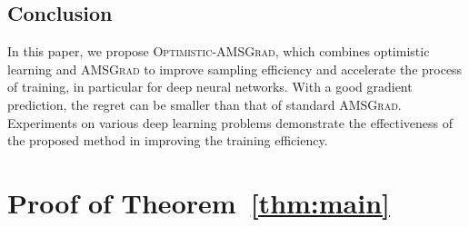 \documentclass[11pt]{article}
\makeatletter
\renewenvironment{proof}[1][\proofname]{%
   \par\pushQED{\qed}\normalfont%
   \topsep6\p@\@plus6\p@\relax
   \trivlist\item[\hskip\labelsep\bfseries#1]%
   \ignorespaces
}{%
   \popQED\endtrivlist\@endpefalse
}
\theoremstyle{k}
\makeatother
\begin{document}
\subsection{Conclusion}
In this paper, we propose \textsc{Optimistic-AMSGrad}, which combines optimistic learning and \textsc{AMSGrad} to improve sampling efficiency and
accelerate the process of training, in particular for deep neural networks. With a good gradient prediction, the regret can be smaller than that of standard \textsc{AMSGrad}. Experiments on various deep learning problems demonstrate the effectiveness of the proposed method in improving the training efficiency. 



\clearpage




\clearpage


\appendix

\section{Proof of Theorem~\ref{thm:main}} \label{app:thm}

\begin{proof}

\end{proof}

\end{document}
